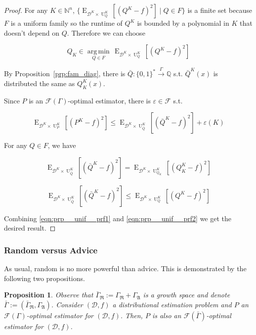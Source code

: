 \documentclass{article}
\numberwithin{equation}{section}
\theoremstyle{definition}
\theoremstyle{plain}
\newtheorem{proposition}{Proposition}[section]
\newcommand{\Bool}{\{0,1\}}
\newcommand{\Words}{{\Bool^*}}
\DeclareMathOperator{\E}{E}
\DeclareMathOperator{\Un}{U}
\newcommand{\Argmin}[1]{\underset{#1}{\operatorname{arg\,min}}\,}
\newcommand{\Nats}{\mathbb{N}}
\newcommand{\Rats}{\mathbb{Q}}
\newcommand{\Dist}{\mathcal{D}}
\newcommand{\GrowR}{\Gamma_{\mathfrak{R}}}
\newcommand{\GrowA}{\Gamma_{\mathfrak{A}}}
\newcommand{\Fall}{\mathcal{F}}
\newcommand{\EG}{\Fall(\Gamma)}
\newcommand{\Scheme}{\xrightarrow{\Gamma}}
\begin{document}
\begin{proof}

For any $K \in \Nats^n$, $\{\E_{\Dist^{K} \times \Un_Q^{K}}[(Q^{K} - f)^2] \mid Q \in F\}$ is a finite set because $F$ is a uniform family so the runtime of $Q^{K}$ is bounded by a polynomial in $K$ that doesn't depend on $Q$. Therefore we can choose 

\[Q_{K} \in \Argmin{Q \in F} \E_{\Dist^{K} \times \Un_Q^{K}}[(Q^{K} - f)^2]\]

By Proposition~\ref{prp:fam_diag}, there is $\bar{Q}: \Words \Scheme \Rats$ s.t. $\bar{Q}^{K}(x)$ is distributed the same as $Q_{K}^{K}(x)$.

Since $P$ is an $\EG$-optimal estimator, there is $\varepsilon \in \Fall$ s.t.

\begin{equation}
\label{eqn:prp__unif__prf1}
\E_{\Dist^{K} \times \Un_P^{K}}[(P^{K} - f)^2] \leq \E_{\Dist^{K} \times \Un_{\bar{Q}}^{K}}[(\bar{Q}^{K} - f)^2] + \varepsilon(K)
\end{equation}

For any $Q \in F$, we have 

$$\E_{\Dist^{K} \times \Un_{\bar{Q}}^{K}}[(\bar{Q}^{K} - f)^2]=\E_{\Dist^{K} \times \Un_{Q_{K}}^{K}}[(Q_{K}^{K} - f)^2]$$

\begin{equation}
\label{eqn:prp__unif__prf2}
\E_{\Dist^{K} \times \Un_{\bar{Q}}^{K}}[(\bar{Q}^{K} - f)^2] \leq \E_{\Dist^{K} \times \Un_Q^{K}}[(Q^{K} - f)^2]
\end{equation}

Combining \ref{eqn:prp__unif__prf1} and \ref{eqn:prp__unif__prf2} we get the desired result.
\end{proof}

\subsubsection{Random versus Advice}

As usual, random is no more powerful than advice. This is demonstrated by the following two propositions.

\begin{proposition}

Observe that $\bar{\Gamma}_{\mathfrak{R}}:=\GrowR+\GrowA$ is a growth space and denote $\bar{\Gamma}:=(\bar{\Gamma}_{\mathfrak{R}},\GrowA)$. Consider $(\Dist,f)$ a distributional estimation problem and $P$ an $\EG$-optimal estimator for $(\Dist,f)$. Then, $P$ is also an $\Fall(\bar{\Gamma})$-optimal estimator for $(\Dist,f)$.

\end{proposition}
\end{document}
